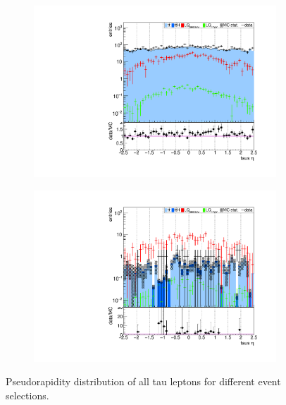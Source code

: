 \begin{figure}
\begin{subfigure}[t]{0.49\textwidth}
                \label{taueta:2b2tau}
                \end{subfigure}
                \begin{subfigure}[t]{0.49\textwidth}
                \includegraphics[width=\textwidth]{figures/plots/kinLQ75/tau_eta_2j1b_1tau.pdf}
                \label{taueta:1b1tau}
                \end{subfigure}
                \begin{subfigure}[t]{0.49\textwidth}
                \includegraphics[width=\textwidth]{figures/plots/kinLQ75/tau_eta_2j1b_2tau.pdf}
                \label{taueta:1b2tau}
                \end{subfigure}
\caption[Pseudorapidity distribution of all taus lepton for different event selections.]{Pseudorapidity distribution of all tau leptons for different event selections.}
\label{taueta}
\end{figure}
